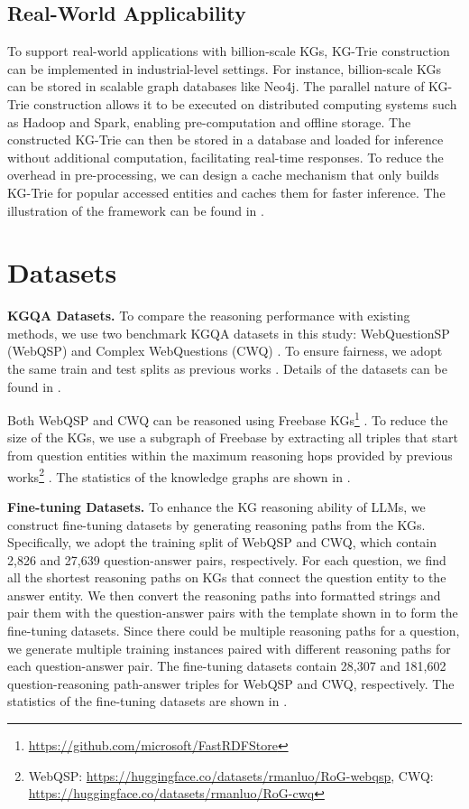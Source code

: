 {    \subsection{Real-World Applicability}
    To support real-world applications with billion-scale KGs, KG-Trie construction can be implemented in industrial-level settings. For instance, billion-scale KGs can be stored in scalable graph databases like Neo4j. The parallel nature of KG-Trie construction allows it to be executed on distributed computing systems such as Hadoop and Spark, enabling pre-computation and offline storage. The constructed KG-Trie can then be stored in a database and loaded for inference without additional computation, facilitating real-time responses. To reduce the overhead in pre-processing, we can design a cache mechanism that only builds KG-Trie for popular accessed entities and caches them for faster inference. The illustration of the framework can be found in .
}
\section{Datasets}\label{app:datasets}

\noindent\textbf{KGQA Datasets.} To compare the reasoning performance with existing methods, we use two benchmark KGQA datasets in this study: WebQuestionSP (WebQSP) \citep{yih2016value} and Complex WebQuestions (CWQ) \citep{talmor2018web}. To ensure fairness, we adopt the same train and test splits as previous works \citep{jiang2022unikgqa,luo2024rog}. Details of the datasets can be found in .

Both WebQSP and CWQ can be reasoned using Freebase KGs\footnote{\url{https://github.com/microsoft/FastRDFStore}} \citep{bollacker2008freebase}. To reduce the size of the KGs, we use a subgraph of Freebase by extracting all triples that start from question entities within the maximum reasoning hops provided by previous works\footnote{WebQSP: \url{https://huggingface.co/datasets/rmanluo/RoG-webqsp}, CWQ: \url{https://huggingface.co/datasets/rmanluo/RoG-cwq}} \citep{luo2024rog}. The statistics of the knowledge graphs are shown in .

\noindent\textbf{Fine-tuning Datasets.} To enhance the KG reasoning ability of LLMs, we construct fine-tuning datasets by generating reasoning paths from the KGs. Specifically, we adopt the training split of WebQSP and CWQ, which contain 2,826 and 27,639 question-answer pairs, respectively. For each question, we find all the shortest reasoning paths on KGs that connect the question entity to the answer entity. We then convert the reasoning paths into formatted strings and pair them with the question-answer pairs with the template shown in   to form the fine-tuning datasets. Since there could be multiple reasoning paths for a question, we generate multiple training instances paired with different reasoning paths for each question-answer pair. The fine-tuning datasets contain 28,307 and 181,602 question-reasoning path-answer triples for WebQSP and CWQ, respectively. The statistics of the fine-tuning datasets are shown in .

